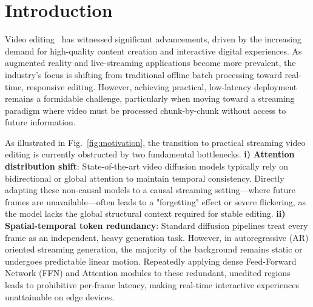 \documentclass{llmxive}
\begin{document}
% 


    


\section{Introduction}
Video editing~\cite{jiang2025vace,li2025egoedit,decart2025lucyedit,qi2023fatezero,wu2023tune,zhang2023controllable, chen2025contextflow,wang2024taming, feng2025dit4edit, wang2024cove, ma2025magicstick, yang2025unified} has witnessed significant advancements, driven by the increasing demand for high-quality content creation and interactive digital experiences. As augmented reality and live-streaming applications become more prevalent, the industry's focus is shifting from traditional offline batch processing toward real-time, responsive editing. However, achieving practical, low-latency deployment remains a formidable challenge, particularly when moving toward a streaming paradigm where video must be processed chunk-by-chunk without access to future information.

As illustrated in Fig.~\ref{fig:motivation}, the transition to practical streaming video editing is currently obstructed by two fundamental bottlenecks. {\bf i)} \textbf{Attention distribution shift}: State-of-the-art video diffusion models typically rely on bidirectional or global attention to maintain temporal consistency. Directly adapting these non-causal models to a causal streaming setting—where future frames are unavailable—often leads to a "forgetting" effect or severe flickering, as the model lacks the global structural context required for stable editing. {\bf ii)} \textbf{Spatial-temporal token redundancy}: Standard diffusion pipelines treat every frame as an independent, heavy generation task. However, in autoregressive (AR) oriented streaming generation, the majority of the background remains static or undergoes predictable linear motion. Repeatedly applying dense Feed-Forward Network (FFN) and Attention modules to these redundant, unedited regions leads to prohibitive per-frame latency, making real-time interactive experiences unattainable on edge devices.
\end{document}
